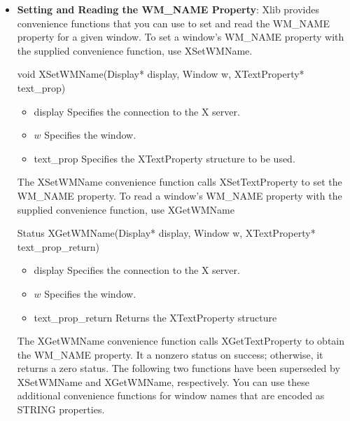 \documentclass{report}
\begin{document}
\begin{itemize}
\begin{itemize}
            \bigbreak \noindent 
            If it was able to read and store the data in the XTextProperty structure, XGetTextProperty returns a nonzero status; otherwise, it returns a zero status.
            \bigbreak \noindent 
            XGetTextProperty can generate BadAtom and BadWindow errors.
        \item \textbf{Setting and Reading the WM\_NAME Property}: Xlib provides convenience functions that you can use to set and read the WM\_NAME property for a given window.
            \bigbreak \noindent 
            To set a window’s WM\_NAME property with the supplied convenience function, use XSetWMName.
            \bigbreak \noindent 
            \begin{cppcode}
                void XSetWMName(Display* display, Window w, XTextProperty* text_prop)
            \end{cppcode}
            \bigbreak \noindent
            \begin{itemize}
                \item display Specifies the connection to the X server.
                \item $w$ Specifies the window.
                \item text\_prop Specifies the XTextProperty structure to be used.
            \end{itemize}
            The XSetWMName convenience function calls XSetTextProperty to set the WM\_NAME property.
            \bigbreak \noindent 
            To read a window’s WM\_NAME property with the supplied convenience function, use XGetWMName
            \bigbreak \noindent 
            \begin{cppcode}
            Status XGetWMName(Display* display, Window w, XTextProperty* text_prop_return)
            \end{cppcode}
            \bigbreak \noindent
            \begin{itemize}
                \item display Specifies the connection to the X server.
                \item $w$ Specifies the window.
                \item text\_prop\_return Returns the XTextProperty structure
            \end{itemize}
            The XGetWMName convenience function calls XGetTextProperty to obtain the WM\_NAME property. It  a nonzero status on success; otherwise, it returns a zero status.
            \bigbreak \noindent 
            The following two functions have been superseded by XSetWMName and XGetWMName, respectively. You can use these additional convenience functions for window names that are encoded as STRING properties.

\end{itemize}
\end{itemize}
\end{document}
